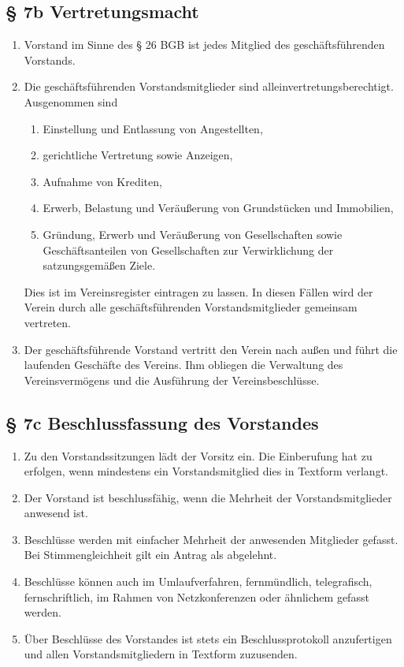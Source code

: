 \documentclass[11pt,a4paper]{scrartcl}
\begin{document}
\subsection*{§ 7b Vertretungsmacht}
\begin{enumerate}[label=\arabic*.]
    \item Vorstand im Sinne des § 26 BGB ist jedes Mitglied des geschäftsführenden Vorstands.
    \item Die geschäftsführenden Vorstandsmitglieder sind alleinvertretungsberechtigt. Ausgenommen sind 
    \begin{enumerate}[label=\roman*.]
        \item Einstellung und Entlassung von Angestellten, 
        \item gerichtliche Vertretung sowie Anzeigen, 
        \item Aufnahme von Krediten, 
        \item Erwerb, Belastung und Veräußerung von Grundstücken und Immobilien,
        \item Gründung, Erwerb und Veräußerung von Gesellschaften sowie Geschäftsanteilen von Gesellschaften zur Verwirklichung der satzungsgemäßen Ziele.
    \end{enumerate}
    Dies ist im Vereinsregister eintragen zu lassen.
    In diesen Fällen wird der Verein durch alle geschäftsführenden Vorstandsmitglieder gemeinsam vertreten.
    \item Der geschäftsführende Vorstand vertritt den Verein nach außen und führt die laufenden Geschäfte des Vereins. Ihm obliegen die Verwaltung des Vereinsvermögens und die Ausführung der Vereinsbeschlüsse.
\end{enumerate}

\subsection*{§ 7c Beschlussfassung des Vorstandes}
\begin{enumerate}[label=\arabic*.]
    \item Zu den Vorstandssitzungen lädt der Vorsitz ein. Die Einberufung hat zu erfolgen, wenn mindestens ein Vorstandsmitglied dies in Textform verlangt.
    \item Der Vorstand ist beschlussfähig, wenn die Mehrheit der Vorstandsmitglieder anwesend ist.
    \item Beschlüsse werden mit einfacher Mehrheit der anwesenden Mitglieder gefasst. Bei Stimmengleichheit gilt ein Antrag als abgelehnt.
    \item Beschlüsse können auch im Umlaufverfahren, fernmündlich, telegrafisch, fernschriftlich, im Rahmen von Netzkonferenzen oder ähnlichem gefasst werden.
    \item Über Beschlüsse des Vorstandes ist stets ein Beschlussprotokoll anzufertigen und allen Vorstandsmitgliedern in Textform zuzusenden. 
\end{enumerate}
\end{document}
